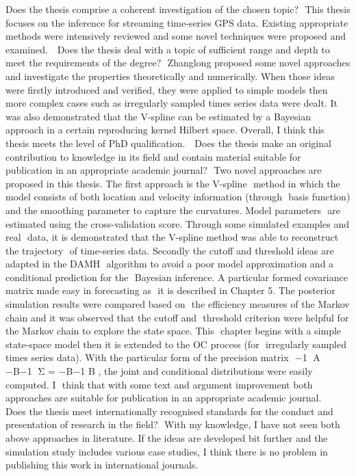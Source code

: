 \documentclass[a4paper,18pt]{extarticle}
\begin{document}
Does the thesis comprise a coherent investigation of the chosen topic?  This thesis focuses on the inference for streaming time-series GPS data. Existing appropriate methods were intensively reviewed and some novel techniques were proposed and examined.  
Does the thesis deal with a topic of sufficient range and depth to meet the requirements of the degree?  Zhanglong proposed some novel approaches and investigate the properties theoretically and numerically. When those ideas were firstly introduced and verified, they were applied to simple models then more complex cases such as irregularly sampled times series data were dealt. It was also demonstrated that the V-spline can be estimated by a Bayesian approach in a certain reproducing kernel Hilbert space. Overall, I think this thesis meets the level of PhD qualification.  
Does the thesis make an original contribution to knowledge in its field and contain material suitable for publication in an appropriate academic journal?  Two novel approaches are proposed in this thesis. The first approach is the V-spline  method in which the model consists of both location and velocity information (through  basis function) and the smoothing parameter to capture the curvatures. Model parameters  are estimated using the cross-validation score. Through some simulated examples and real  data, it is demonstrated that the V-spline method was able to reconstruct the trajectory  of time-series data. Secondly the cutoff and threshold ideas are adapted in the DAMH  algorithm to avoid a poor model approximation and a conditional prediction for the  Bayesian inference. A particular formed covariance matrix made easy in forecasting as  it is described in Chapter 5. The posterior simulation results were compared based on  the efficiency measures of the Markov chain and it was observed that the cutoff and  threshold criterion were helpful for the Markov chain to explore the state space. This  chapter begins with a simple state-space model then it is extended to the OC process (for  irregularly sampled times series data). With the particular form of the precision matrix  −1 􏰀A −B−1􏰁 Σ = −B−1 B , the joint and conditional distributions were easily computed. I  think that with some text and argument improvement both approaches are suitable for publication in an appropriate academic journal.  
Does the thesis meet internationally recognised standards for the conduct and presentation of research in the field?  With my knowledge, I have not seen both above approaches in literature. If the ideas are developed bit further and the simulation study includes various case studies, I think there is no problem in publishing this work in international journals.  
\end{document}
